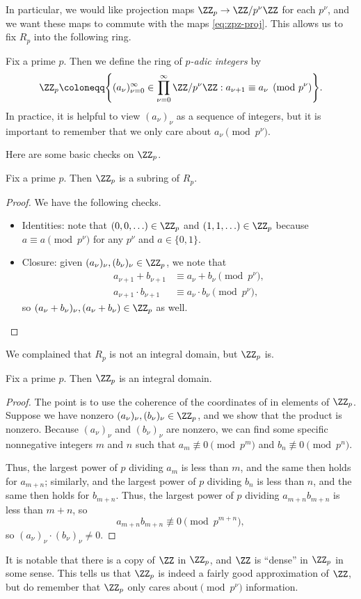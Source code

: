 \documentclass[../notes.tex]{subfiles}
\begin{document}
In particular, we would like projection maps $\ZZ_p\to\ZZ/p^\nu\ZZ$ for each $p^\nu$, and we want these maps to commute with the maps \eqref{eq:zpz-proj}. This allows us to fix $R_p$ into the following ring.
\begin{defihelper} 
	Fix a prime $p$. Then we define the ring of \textit{$p$-adic integers} by
	\[\ZZ_p\coloneqq\Bigg\{(a_\nu)_{\nu=0}^\infty\in\prod_{\nu=0}^\infty\ZZ/p^\nu\ZZ:a_{\nu+1}\equiv a_\nu\pmod{p^\nu}\Bigg\}.\]
	In practice, it is helpful to view $(a_\nu)_\nu$ as a sequence of integers, but it is important to remember that we only care about $a_\nu\pmod{p^\nu}$.
\end{defihelper}
Here are some basic checks on $\ZZ_p$.
\begin{lemma}
	Fix a prime $p$. Then $\ZZ_p$ is a subring of $R_p$.
\end{lemma}
\begin{proof}
	We have the following checks.
	\begin{itemize}
		\item Identities: note that $(0,0,\ldots)\in\ZZ_p$ and $(1,1,\ldots)\in\ZZ_p$ because $a\equiv a\pmod{p^\nu}$ for any $p^\nu$ and $a\in\{0,1\}$.
		\item Closure: given $(a_\nu)_\nu,(b_\nu)_\nu\in\ZZ_p$, we note that
		\begin{align*}
			a_{\nu+1}+b_{\nu+1} &\equiv a_\nu+b_\nu\pmod{p^\nu}, \\
			a_{\nu+1}\cdot b_{\nu+1} &\equiv a_\nu\cdot b_\nu\pmod{p^\nu},
		\end{align*}
		so $(a_\nu+b_\nu)_\nu,(a_\nu+b_\nu)\in\ZZ_p$ as well.
		\qedhere
	\end{itemize}
\end{proof}
We complained that $R_p$ is not an integral domain, but $\ZZ_p$ is.
\begin{lemma}
	Fix a prime $p$. Then $\ZZ_p$ is an integral domain.
\end{lemma}
\begin{proof}
	The point is to use the coherence of the coordinates of in elements of $\ZZ_p$. Suppose we have nonzero $(a_\nu)_\nu,(b_\nu)_\nu\in\ZZ_p$, and we show that the product is nonzero. Because $(a_\nu)_\nu$ and $(b_\nu)_\nu$ are nonzero, we can find some specific nonnegative integers $m$ and $n$ such that $a_m\not\equiv0\pmod{p^m}$ and $b_n\not\equiv0\pmod{p^n}$.
	
	Thus, the largest power of $p$ dividing $a_m$ is less than $m$, and the same then holds for $a_{m+n}$; similarly, and the largest power of $p$ dividing $b_n$ is less than $n$, and the same then holds for $b_{m+n}$. Thus, the largest power of $p$ dividing $a_{m+n}b_{m+n}$ is less than $m+n$, so
	\[a_{m+n}b_{m+n}\not\equiv0\pmod{p^{m+n}},\]
	so $(a_\nu)_\nu\cdot(b_\nu)_\nu\ne0$.
\end{proof}
It is notable that there is a copy of $\ZZ$ in $\ZZ_p$, and $\ZZ$ is ``dense'' in $\ZZ_p$ in some sense. This tells us that $\ZZ_p$ is indeed a fairly good approximation of $\ZZ$, but do remember that $\ZZ_p$ only cares about$\pmod{p^\nu}$ information.\todo{}
\end{document}
